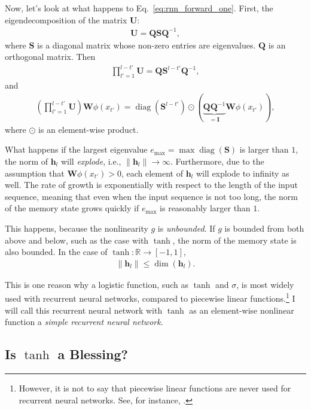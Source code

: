 \documentclass{report}
\newcommand{\vect}[1]{\mathbf{#1}}
\newcommand{\matr}[1]{\mathbf{#1}}
\newcommand{\diag}[0]{\operatorname{diag}}
\newcommand{\vh}[0]{\vect{h}}
\newcommand{\mW}[0]{\matr{W}}
\newcommand{\mQ}[0]{\matr{Q}}
\newcommand{\mU}[0]{\matr{U}}
\newcommand{\mS}{\matr{S}}
\newcommand{\mI}{\matr{I}}
\newcommand{\RR}[0]{\mathbb{R}}
\newcommand{\sigmoid}{\sigma}
\begin{document}
Now, let's look at what happens to Eq.~\eqref{eq:rnn_forward_one}. First, the
eigendecomposition of the matrix $\mU$:
\begin{align*}
    \mU = \mQ \mS \mQ^{-1},
\end{align*}
where $\mS$ is a diagonal matrix whose non-zero entries are eigenvalues.
$\mQ$ is an orthogonal matrix. Then
\begin{align*}
    \prod_{l'=1}^{l-t'} \mU = \mQ \mS^{l-t'} \mQ^{-1},
\end{align*}
and
\begin{align*}
    \left(\prod_{l'=1}^{l-t'} \mU\right) \mW\phi(x_{t'})
    = \diag(\mS^{l-t'}) \odot (\underbrace{\mQ \mQ^{-1}}_{=\mI} \mW\phi(x_{t'})),
\end{align*}
where $\odot$ is an element-wise product.

What happens if the largest eigenvalue $e_{\max} = \max \diag(\mS)$ is larger
than $1$, the norm of $\vh_l$ will {\em explode}, i.e., $\|\vh_l\| \to \infty$.
Furthermore, due to the assumption that $\mW\phi(x_{t'}) > 0$, each element of
$\vh_l$ will explode to infinity as well. The rate of growth is exponentially
with respect to  the length of the input sequence, meaning that even when the
input sequence is not too long, the norm of the memory state grows quickly if
$e_{\max}$ is reasonably larger than $1$. 

This happens, because the nonlinearity $g$ is {\em unbounded}. If $g$ is bounded
from both above and below, such as the case with $\tanh$, the norm of the memory
state is also bounded. In the case of $\tanh:\RR \to \left[ -1, 1\right]$,
\begin{align*}
    \|\vh_l\|\leq \dim(\vh_l).
\end{align*}

This is one reason why a logistic function, such as $\tanh$ and $\sigmoid$, is
most widely used with recurrent neural networks, compared to piecewise linear
functions.\footnote{
    However, it is not to say that piecewise linear functions are never used for
    recurrent neural networks. See, for instance,
    \citet{le2015simple,bengio2013advances}.
} I will call this recurrent neural network with $\tanh$ as an element-wise
nonlinear function a {\em simple recurrent neural network}. 

\subsection{Is $\tanh$ a Blessing?}
\label{sec:vanishing_grad}
\end{document}
